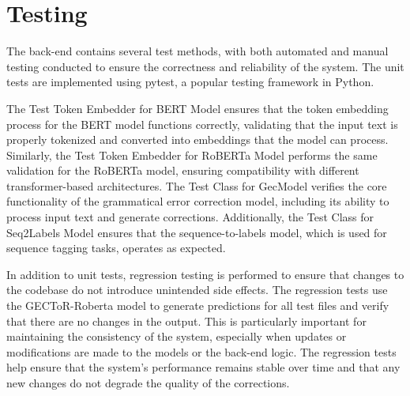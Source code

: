 \section{Testing}

The back-end contains several test methods, with both automated and manual testing conducted to ensure the correctness and reliability of the system.
The unit tests are implemented using pytest, a popular testing framework in Python.

%

The Test Token Embedder for BERT Model ensures that the token embedding process for the BERT model functions correctly, validating that the input text is properly tokenized and converted into embeddings that the model can process.
Similarly, the Test Token Embedder for RoBERTa Model performs the same validation for the RoBERTa model, ensuring compatibility with different transformer-based architectures.
The Test Class for GecModel verifies the core functionality of the grammatical error correction model, including its ability to process input text and generate corrections.
Additionally, the Test Class for Seq2Labels Model ensures that the sequence-to-labels model, which is used for sequence tagging tasks, operates as expected.

In addition to unit tests, regression testing is performed to ensure that changes to the codebase do not introduce unintended side effects.
The regression tests use the GECToR-Roberta model to generate predictions for all test files and verify that there are no changes in the output.
This is particularly important for maintaining the consistency of the system, especially when updates or modifications are made to the models or the back-end logic.
The regression tests help ensure that the system's performance remains stable over time and that any new changes do not degrade the quality of the corrections.

